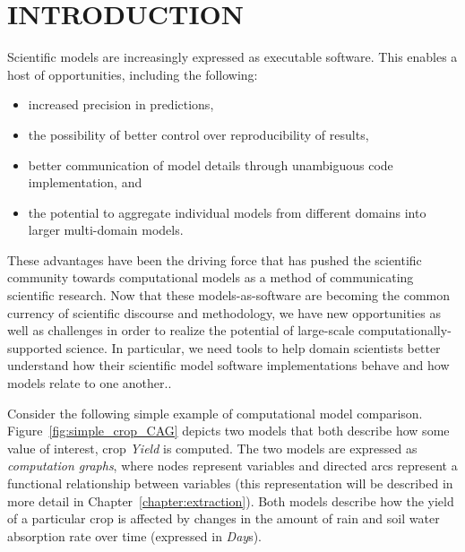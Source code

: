 \chapter{INTRODUCTION\label{chapter:introduction}}
Scientific models are increasingly expressed as executable software.
This enables a host of opportunities, including the following:
\begin{itemize}
\item increased precision in predictions,
\item the possibility of better control over reproducibility of results,
\item better communication of model details through unambiguous code implementation, and
\item the potential to aggregate individual models from different domains into larger multi-domain models.
\end{itemize}
These advantages have been the driving force that has pushed the scientific community towards computational models as a method of communicating scientific research.
Now that these models-as-software are becoming the common currency of scientific discourse and methodology, we have new opportunities as well as challenges in order to realize the potential of large-scale computationally-supported science.
In particular, we need tools to help domain scientists better understand how their scientific model software implementations behave and how models relate to one another..

Consider the following simple example of computational model comparison. Figure~\ref{fig:simple_crop_CAG} depicts two models that both describe how some value of interest, crop \emph{Yield} is computed. The two models are expressed as \emph{computation graphs}, where nodes represent variables and directed arcs represent a functional relationship between variables (this representation will be described in more detail in Chapter~\ref{chapter:extraction}).
Both models describe how the yield of a particular crop is affected by changes in the amount of rain and soil water absorption rate over time (expressed in \emph{Day}s).

